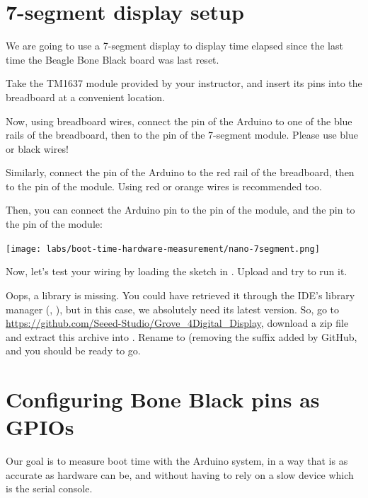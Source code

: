 \section{7-segment display setup}

We are going to use a 7-segment display to display time elapsed since
the last time the Beagle Bone Black board was last reset.

Take the TM1637 module provided by your instructor, and insert its pins
into the breadboard at a convenient location.

Now, using breadboard wires, connect the  pin of the Arduino to one
of the blue rails of the breadboard, then to the  pin of the 7-segment
module. Please use blue or black wires!

Similarly, connect the  pin of the Arduino to the red rail of
the breadboard, then to the  pin of the module. Using red or
orange wires is recommended too.

Then, you can connect the Arduino  pin to the  pin of
the module, and the  pin to the  pin of the module:

\begin{center}
\texttt{[image: labs/boot-time-hardware-measurement/nano-7segment.png]}
\end{center}

Now, let's test your wiring by loading the sketch in
. Upload and try to run it.

Oops, a library is missing. You could have retrieved it through the
IDE's library manager (, ), but in
this case, we absolutely need its latest version. So, go to
\url{https://github.com/Seeed-Studio/Grove_4Digital_Display},
download a zip file and extract this archive into
. Rename 
to  (removing the  suffix
added by GitHub, and you should be ready to go.

\section{Configuring Bone Black pins as GPIOs}

Our goal is to measure boot time with the Arduino system, in a way that
is as accurate as hardware can be, and without having to rely on a slow
device which is the serial console.

